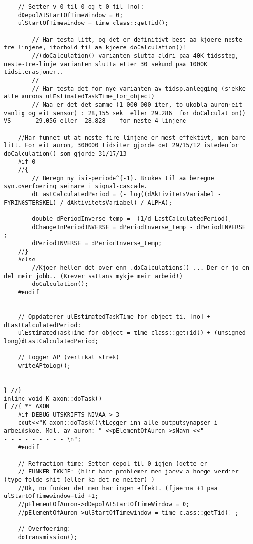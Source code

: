 \begin{lstlisting}
	// Setter v_0 til 0 og t_0 til [no]:
	dDepolAtStartOfTimeWindow = 0;
	ulStartOfTimewindow = time_class::getTid();

		// Har testa litt, og det er definitivt best aa kjoere neste tre linjene, iforhold til aa kjoere doCalculation()!
		//(doCalculation() varianten slutta aldri paa 40K tidssteg, neste-tre-linje varianten slutta etter 30 sekund paa 1000K tidsiterasjoner..
		//
		// Har testa det for nye varianten av tidsplanlegging (sjekke alle aurons ulEstimatedTaskTime_for_object)
		// Naa er det det samme (1 000 000 iter, to ukobla auron(eit vanlig og eit sensor) : 28,155 sek  eller 29.286  for doCalculation() VS 		29.056 eller  28.828 	for neste 4 linjene

	//Har funnet ut at neste fire linjene er mest effektivt, men bare litt. For eit auron, 300000 tidsiter gjorde det 29/15/12 istedenfor doCalculation() som gjorde 31/17/13
	#if 0
	//{
		// Beregn ny isi-periode^{-1}. Brukes til aa beregne syn.overfoering seinare i signal-cascade.
		dL astCalculatedPeriod = (- log((dAktivitetsVariabel - FYRINGSTERSKEL) / dAktivitetsVariabel) / ALPHA);
		
		double dPeriodInverse_temp =  (1/d LastCalculatedPeriod);
 		dChangeInPeriodINVERSE = dPeriodInverse_temp - dPeriodINVERSE ;
		dPeriodINVERSE = dPeriodInverse_temp;
	//}
	#else
		//Kjoer heller det over enn .doCalculations() ... Der er jo en del meir jobb.. (Krever sattans mykje meir arbeid!)
		doCalculation();
	#endif


	// Oppdaterer ulEstimatedTaskTime_for_object til [no] + dLastCalculatedPeriod:
	ulEstimatedTaskTime_for_object = time_class::getTid() + (unsigned long)dLastCalculatedPeriod;

	// Logger AP (vertikal strek)
	writeAPtoLog();
	
	
} //}
inline void K_axon::doTask()
{ //{ ** AXON
	#if DEBUG_UTSKRIFTS_NIVAA > 3
 	cout<<"K_axon::doTask()\tLegger inn alle outputsynapser i arbeidskoe. Mdl. av auron: " <<pElementOfAuron->sNavn <<" - - - - - - - - - - - - - - - \n";
	#endif

	// Refraction time: Setter depol til 0 igjen (dette er 
	// FUNKER IKKJE: (blir bare problemer med jaevvla hoege verdier (type folde-shit (eller ka-det-ne-neiter) )
	//Ok, no funker det men har ingen effekt. (fjaerna +1 paa ulStartOfTimewindow=tid +1;
	//pElementOfAuron->dDepolAtStartOfTimeWindow = 0;
	//pElementOfAuron->ulStartOfTimewindow = time_class::getTid() ;

	// Overfoering:
	doTransmission();


\end{lstlisting}
